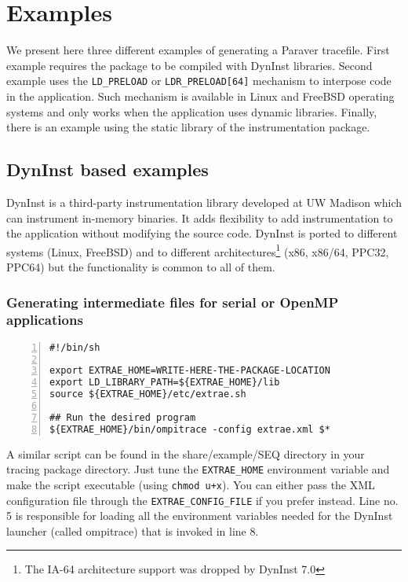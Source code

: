 \chapter{Examples}\label{cha:Examples}

We present here three different examples of generating a Paraver tracefile. First example requires the package to be compiled with DynInst libraries. Second example uses the {\tt LD\_PRELOAD} or {\tt LDR\_PRELOAD[64]} mechanism to interpose code in the application. Such mechanism is available in Linux and FreeBSD operating systems and only works when the application uses dynamic libraries. Finally, there is an example using the static library of the instrumentation package.

\section{DynInst based examples}\label{sec:Examples_DynInst}

DynInst is a third-party instrumentation library developed at UW Madison which can instrument in-memory binaries. It adds flexibility to add instrumentation to the application without modifying the source code. DynInst is ported to different systems (Linux, FreeBSD) and to different architectures\footnote{The IA-64 architecture support was dropped by DynInst 7.0} (x86, x86/64, PPC32, PPC64) but the functionality is common to all of them.

\subsection{Generating intermediate files for serial or OpenMP applications}\label{subsec:Examples_DynInst_Intermediate}

\begin{Verbatim}[frame=single,numbers=left,labelposition=topline,label=run\_dyninst.sh]
#!/bin/sh

export EXTRAE_HOME=WRITE-HERE-THE-PACKAGE-LOCATION
export LD_LIBRARY_PATH=${EXTRAE_HOME}/lib
source ${EXTRAE_HOME}/etc/extrae.sh

## Run the desired program
${EXTRAE_HOME}/bin/ompitrace -config extrae.xml $*
\end{Verbatim}

A similar script can be found in the share/example/SEQ directory in your tracing package directory. Just tune the {\tt EXTRAE\_HOME} environment variable and make the script executable (using {\tt chmod u+x}). You can either pass the XML configuration file through the {\tt EXTRAE\_CONFIG\_FILE} if you prefer instead. Line no. 5 is responsible for loading all the environment variables needed for the DynInst launcher (called ompitrace) that is invoked in line 8.

